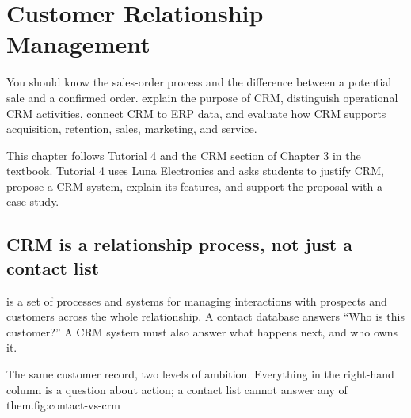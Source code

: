 \chapter{Customer Relationship Management}
\label{ch:crm}

\chapterguide
  {You should know the sales-order process and the difference between a potential sale and a confirmed order.}
  {explain the purpose of CRM, distinguish operational CRM activities, connect CRM to ERP data, and evaluate how CRM supports acquisition, retention, sales, marketing, and service.}

\begin{sourcebasis}
This chapter follows Tutorial 4 and the CRM section of Chapter 3 in the
textbook. Tutorial 4 uses Luna Electronics and asks students to justify CRM,
propose a CRM system, explain its features, and support the proposal with a case
study.
\end{sourcebasis}

\section{CRM is a relationship process, not just a contact list}

 is a set of processes and systems
for managing interactions with prospects and customers across the whole
relationship. A contact database answers ``Who is this customer?'' A CRM system
must also answer what happens next, and who owns it.

\begin{utpfig}{The same customer record, two levels of
ambition. Everything in the right-hand column is a question about action; a
contact list cannot answer any of them.}{fig:contact-vs-crm}
\end{utpfig}

